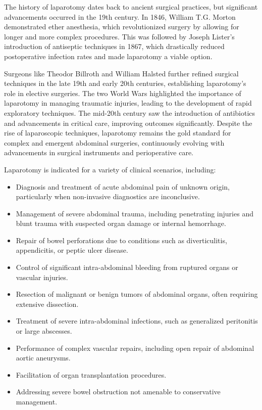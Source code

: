 The history of laparotomy dates back to ancient surgical practices, but significant advancements occurred in the 19th century. In 1846, William T.G. Morton demonstrated ether anesthesia, which revolutionized surgery by allowing for longer and more complex procedures. This was followed by Joseph Lister's introduction of antiseptic techniques in 1867, which drastically reduced postoperative infection rates and made laparotomy a viable option.

Surgeons like Theodor Billroth and William Halsted further refined surgical techniques in the late 19th and early 20th centuries, establishing laparotomy's role in elective surgeries. The two World Wars highlighted the importance of laparotomy in managing traumatic injuries, leading to the development of rapid exploratory techniques. The mid-20th century saw the introduction of antibiotics and advancements in critical care, improving outcomes significantly. Despite the rise of laparoscopic techniques, laparotomy remains the gold standard for complex and emergent abdominal surgeries, continuously evolving with advancements in surgical instruments and perioperative care.

Laparotomy is indicated for a variety of clinical scenarios, including:

\begin{itemize}
  \item Diagnosis and treatment of acute abdominal pain of unknown origin, particularly when non-invasive diagnostics are inconclusive.
  \item Management of severe abdominal trauma, including penetrating injuries and blunt trauma with suspected organ damage or internal hemorrhage.
  \item Repair of bowel perforations due to conditions such as diverticulitis, appendicitis, or peptic ulcer disease.
  \item Control of significant intra-abdominal bleeding from ruptured organs or vascular injuries.
  \item Resection of malignant or benign tumors of abdominal organs, often requiring extensive dissection.
  \item Treatment of severe intra-abdominal infections, such as generalized peritonitis or large abscesses.
  \item Performance of complex vascular repairs, including open repair of abdominal aortic aneurysms.
  \item Facilitation of organ transplantation procedures.
  \item Addressing severe bowel obstruction not amenable to conservative management.
\end{itemize}

